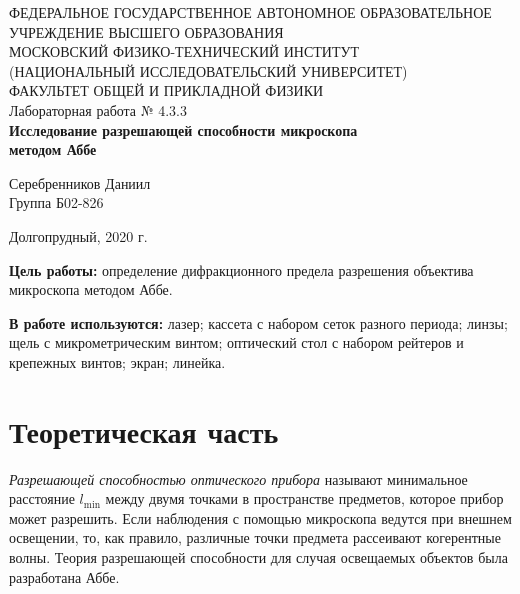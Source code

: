 \documentclass[a4paper,12pt]{article} %
\begin{document}
\begin{center}
	\footnotesize{ФЕДЕРАЛЬНОЕ ГОСУДАРСТВЕННОЕ АВТОНОМНОЕ ОБРАЗОВАТЕЛЬНОЕ 			УЧРЕЖДЕНИЕ ВЫСШЕГО ОБРАЗОВАНИЯ}\\
	\footnotesize{МОСКОВСКИЙ ФИЗИКО-ТЕХНИЧЕСКИЙ ИНСТИТУТ\\(НАЦИОНАЛЬНЫЙ 			ИССЛЕДОВАТЕЛЬСКИЙ УНИВЕРСИТЕТ)}\\
	\footnotesize{ФАКУЛЬТЕТ ОБЩЕЙ И ПРИКЛАДНОЙ ФИЗИКИ\\}
	\hfill \break
	\hfill\break
	\hfill\break
	\hfill \break
	\hfill \break
	\hfill \break
	\hfill \break
	\hfill \break
	\hfill \break
	\hfill \break
	\hfill \break
	\hfill \break
	\hfill \break
	\hfill \break
	\large{Лабораторная работа № 4.3.3\\\textbf{Исследование разрешающей способности микроскопа\\ методом Аббе}}\\
	\hfill \break
	\hfill \break
	\hfill \break
	\begin{flushright}
		Серебренников Даниил\\
		Группа Б02-826
	\end{flushright}
	\hfill \break
	\hfill \break
	\hfill \break
	\hfill \break
	\hfill \break
	\hfill \break
	\hfill \break
	\hfill \break
	\hfill \break
	\hfill \break
	\hfill \break
\end{center}
\begin{center}
	Долгопрудный, 2020 г.
\end{center}
\thispagestyle{empty}
\newpage

\textbf{Цель работы:} определение дифракционного предела разрешения объектива микроскопа методом Аббе.

\textbf{В работе используются:} лазер; кассета с набором сеток разного периода; линзы; щель с микрометрическим винтом; оптический стол с набором рейтеров и крепежных винтов; экран; линейка. 


\section{Теоретическая часть}
	\textit{Разрешающей способностью оптического прибора} называют минимальное расстояние $l_{\text{min}}$ между двумя точками в пространстве предметов, которое прибор может разрешить. Если наблюдения с помощью микроскопа ведутся при внешнем освещении, то, как правило, различные точки предмета рассеивают когерентные волны. Теория разрешающей способности для случая освещаемых объектов была разработана Аббе.
\end{document}
